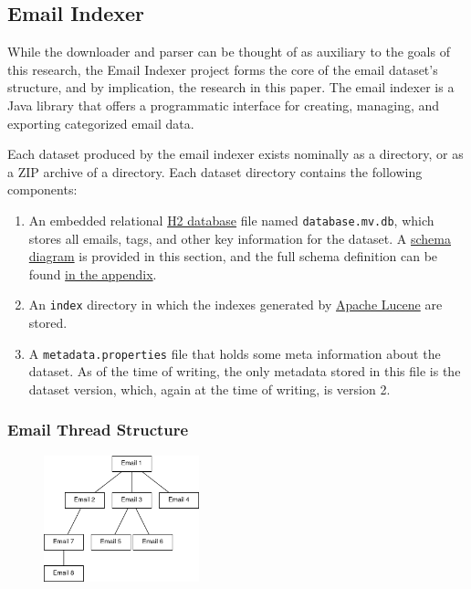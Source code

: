 \documentclass[a4paper, 12pt]{article}
\begin{document}
	\newpage
	\subsection{Email Indexer}
		\label{sec:email-indexer}
		While the downloader and parser can be thought of as auxiliary to the goals of this research, the Email Indexer project forms the core of the email dataset's structure, and by implication, the research in this paper. The email indexer is a Java library that offers a programmatic interface for creating, managing, and exporting categorized email data.
		
		Each dataset produced by the email indexer exists nominally as a directory, or as a ZIP archive of a directory. Each dataset directory contains the following components:
		
		\begin{enumerate}
			\item An embedded relational \href{https://www.h2database.com}{H2 database} file named \texttt{database.mv.db}, which stores all emails, tags, and other key information for the dataset. A \hyperref[fig:schema]{schema diagram} is provided in this section, and the full schema definition can be found \hyperref[sec:dataset-schema]{in the appendix}.
			\item An \texttt{index} directory in which the indexes generated by \href{https://lucene.apache.org/}{Apache Lucene} are stored.
			\item A \texttt{metadata.properties} file that holds some meta information about the dataset. As of the time of writing, the only metadata stored in this file is the dataset version, which, again at the time of writing, is version 2.
		\end{enumerate}
	
		\subsubsection{Email Thread Structure}
			\begin{figure}
				\label{fig:email-threads}
				\includegraphics[width=0.4\textwidth]{img/email-threads.png}
			\end{figure}
			
\end{document}
